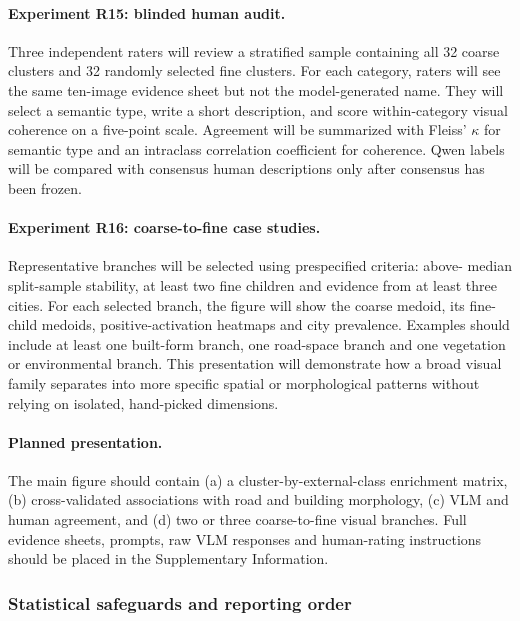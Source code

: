 \paragraph{Experiment R15: blinded human audit.}
Three independent raters will review a stratified sample containing all 32
coarse clusters and 32 randomly selected fine clusters. For each category,
raters will see the same ten-image evidence sheet but not the model-generated
name. They will select a semantic type, write a short description, and score
within-category visual coherence on a five-point scale. Agreement will be
summarized with Fleiss' $\kappa$ for semantic type and an intraclass correlation
coefficient for coherence. Qwen labels will be compared with consensus human
descriptions only after consensus has been frozen.

\paragraph{Experiment R16: coarse-to-fine case studies.}
Representative branches will be selected using prespecified criteria: above-
median split-sample stability, at least two fine children and evidence from at
least three cities. For each selected branch, the figure will show the coarse
medoid, its fine-child medoids, positive-activation heatmaps and city prevalence.
Examples should include at least one built-form branch, one road-space branch
and one vegetation or environmental branch. This presentation will demonstrate
how a broad visual family separates into more specific spatial or morphological
patterns without relying on isolated, hand-picked dimensions.

\paragraph{Planned presentation.}
The main figure should contain (a) a cluster-by-external-class enrichment matrix,
(b) cross-validated associations with road and building morphology, (c) VLM and
human agreement, and (d) two or three coarse-to-fine visual branches. Full
evidence sheets, prompts, raw VLM responses and human-rating instructions should
be placed in the Supplementary Information.

\subsubsection*{Statistical safeguards and reporting order}
\label{sec:results_safeguards}


